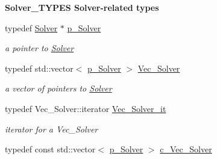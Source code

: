 \begin{Indent}\textbf{ Solver\+\_\+\+T\+Y\+P\+ES Solver-\/related types}\par
\begin{DoxyCompactItemize}
\item 
\mbox{\label{namespace_s_m_spp__di__unipi__it_a1bdc8aa04eda7cc0e3cfbf1eb9aeb06b}} 
typedef \mbox{\hyperlink{class_s_m_spp__di__unipi__it_1_1_solver}{Solver}} $\ast$ \mbox{\hyperlink{namespace_s_m_spp__di__unipi__it_a1bdc8aa04eda7cc0e3cfbf1eb9aeb06b}{p\+\_\+\+Solver}}
\begin{DoxyCompactList}\small\item\em a pointer to \mbox{\hyperlink{class_s_m_spp__di__unipi__it_1_1_solver}{Solver}} \end{DoxyCompactList}\item 
\mbox{\label{namespace_s_m_spp__di__unipi__it_a2af2376c11097ab2f74c3c5697b80b9f}} 
typedef std\+::vector$<$ \mbox{\hyperlink{namespace_s_m_spp__di__unipi__it_a1bdc8aa04eda7cc0e3cfbf1eb9aeb06b}{p\+\_\+\+Solver}} $>$ \mbox{\hyperlink{namespace_s_m_spp__di__unipi__it_a2af2376c11097ab2f74c3c5697b80b9f}{Vec\+\_\+\+Solver}}
\begin{DoxyCompactList}\small\item\em a vector of pointers to \mbox{\hyperlink{class_s_m_spp__di__unipi__it_1_1_solver}{Solver}} \end{DoxyCompactList}\item 
\mbox{\label{namespace_s_m_spp__di__unipi__it_af6fb2943e608a090bd961539eb92abf4}} 
typedef Vec\+\_\+\+Solver\+::iterator \mbox{\hyperlink{namespace_s_m_spp__di__unipi__it_af6fb2943e608a090bd961539eb92abf4}{Vec\+\_\+\+Solver\+\_\+it}}
\begin{DoxyCompactList}\small\item\em iterator for a Vec\+\_\+\+Solver \end{DoxyCompactList}\item 
\mbox{\label{namespace_s_m_spp__di__unipi__it_a09475675a475abf6112ca94c0c8062da}} 
typedef const std\+::vector$<$ \mbox{\hyperlink{namespace_s_m_spp__di__unipi__it_a1bdc8aa04eda7cc0e3cfbf1eb9aeb06b}{p\+\_\+\+Solver}} $>$ \mbox{\hyperlink{namespace_s_m_spp__di__unipi__it_a09475675a475abf6112ca94c0c8062da}{c\+\_\+\+Vec\+\_\+\+Solver}}

\end{DoxyCompactItemize}
\end{Indent}
